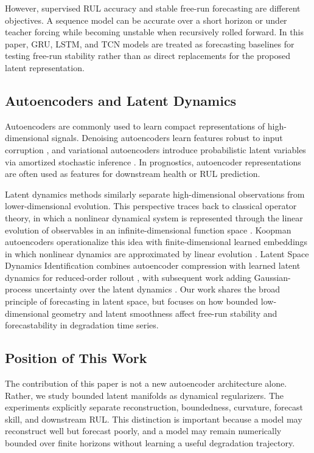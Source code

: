 \documentclass[a4paper,fleqn]{cas-sc}
\begin{document}
However, supervised RUL accuracy and stable free-run forecasting are different
objectives. A sequence model can be accurate over a short horizon or under
teacher forcing while becoming unstable when recursively rolled forward. In
this paper, GRU, LSTM, and TCN models are treated as forecasting baselines for
testing free-run stability rather than as direct replacements for the proposed
latent representation.

\subsection{Autoencoders and Latent Dynamics}

Autoencoders are commonly used to learn compact representations of
high-dimensional signals. Denoising autoencoders learn features robust to input
corruption \citep{vincent2008dae}, and variational autoencoders introduce
probabilistic latent variables via amortized stochastic inference
\citep{kingma2014autoencoding,rezende2014stochastic}. In prognostics,
autoencoder representations are often used as features for downstream health
or RUL prediction.

Latent dynamics methods similarly separate high-dimensional observations from
lower-dimensional evolution. This perspective traces back to classical operator
theory, in which a nonlinear dynamical system is represented through the
linear evolution of observables in an infinite-dimensional function space
\citep{koopman1931hamiltonian}. Koopman autoencoders operationalize this idea
with finite-dimensional learned embeddings in which nonlinear dynamics are
approximated by linear evolution
\citep{lusch2018deep,erichson2020forecasting}. Latent Space Dynamics
Identification combines autoencoder compression with learned latent dynamics
for reduced-order rollout \citep{fries2022lasdi}, with subsequent work adding
Gaussian-process uncertainty over the latent dynamics
\citep{bonneville2024gplasdi}. Our work shares the broad
principle of forecasting in latent space, but focuses on how bounded
low-dimensional geometry and latent smoothness affect free-run stability and
forecastability in degradation time series.

\subsection{Position of This Work}

The contribution of this paper is not a new autoencoder architecture alone.
Rather, we study bounded latent manifolds as dynamical regularizers. The
experiments explicitly separate reconstruction, boundedness, curvature,
forecast skill, and downstream RUL. This distinction is important because a
model may reconstruct well but forecast poorly, and a model may remain
numerically bounded over finite horizons without learning a useful degradation
trajectory.
\end{document}
